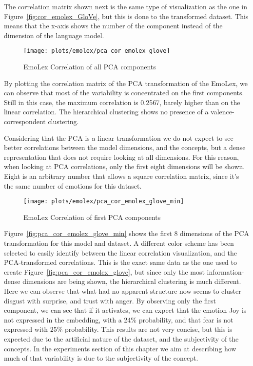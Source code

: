 The correlation matrix shown next is the same type of visualization as the one in Figure~\ref{fig:cor_emolex_GloVe}, but this is done to the transformed dataset. This means that the x-axis shows the number of the component instead of the dimension of the language model.

\begin{figure}[H]
  \texttt{[image: plots/emolex/pca\_cor\_emolex\_glove]}
  \centering
  \caption{EmoLex Correlation of all PCA components}
\end{figure}\label{fig:pca_cor_emolex_glove}

By plotting the correlation matrix of the PCA transformation of the EmoLex, we can observe that most of the variability is concentrated on the first components. Still in this case, the maximum correlation is 0.2567, barely higher than on the linear correlation. The hierarchical clustering shows no presence of a valence-correspondent clustering.

Considering that the PCA is a linear transformation we do not expect to see better correlations between the model dimensions, and the concepts, but a dense representation that does not require looking at all dimensions. For this reason, when looking at PCA correlations, only the first eight dimensions will be shown. Eight is an arbitrary number that allows a square correlation matrix, since it's the same number of emotions for this dataset.

\begin{figure}[H]
  \texttt{[image: plots/emolex/pca\_cor\_emolex\_glove\_min]}
  \centering
  \caption{EmoLex Correlation of first PCA components}
\end{figure}\label{fig:pca_cor_emolex_glove_min}

Figure~\ref{fig:pca_cor_emolex_glove_min} shows the first 8 dimensions of the PCA transformation for this model and dataset. A different color scheme has been selected to easily identify between the linear correlation visualization, and the PCA-transformed correlations. This is the exact same data as the one used to create Figure~\ref{fig:pca_cor_emolex_glove}, but since only the most information-dense dimensions are being shown, the hierarchical clustering is much different. Here we can observe that what had no apparent structure now seems to cluster disgust with surprise, and trust with anger. By observing only the first component, we can see that if it activates, we can expect that the emotion Joy is not expressed in the embedding, with a 24\% probability, and that fear is not expressed with 25\% probability. This results are not very concise, but this is expected due to the artificial nature of the dataset, and the subjectivity of the concepts. In the experiments section of this chapter we aim at describing how much of that variability is due to the subjectivity of the concept.

